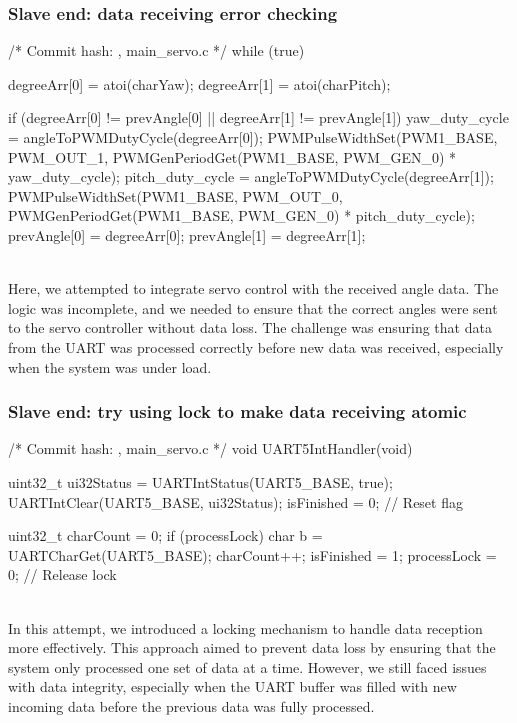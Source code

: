 \documentclass[12pt, a4paper]{article}
\begin{document}
\subsubsection{Slave end: data receiving error checking}\text{}
\begin{code}
/* Commit hash: , main_servo.c */
while (true) {
    degreeArr[0] = atoi(charYaw);
    degreeArr[1] = atoi(charPitch);

    if (degreeArr[0] != prevAngle[0] || degreeArr[1] != prevAngle[1]) {
        yaw_duty_cycle = angleToPWMDutyCycle(degreeArr[0]);
        PWMPulseWidthSet(PWM1_BASE, PWM_OUT_1, PWMGenPeriodGet(PWM1_BASE, PWM_GEN_0) * yaw_duty_cycle);
        pitch_duty_cycle = angleToPWMDutyCycle(degreeArr[1]);
        PWMPulseWidthSet(PWM1_BASE, PWM_OUT_0, PWMGenPeriodGet(PWM1_BASE, PWM_GEN_0) * pitch_duty_cycle);
        prevAngle[0] = degreeArr[0];
        prevAngle[1] = degreeArr[1];
    }
}
\end{code}\text{}\\
Here, we attempted to integrate servo control with the received angle data. 
The logic was incomplete, and we needed to ensure that the correct angles were sent to the servo 
controller without data loss. The challenge was ensuring that data from the UART was processed correctly 
before new data was received, especially when the system was under load.

\subsubsection{Slave end: try using lock to make data receiving atomic}\text{}
\begin{code}
/* Commit hash: , main_servo.c */
void UART5IntHandler(void) {
    uint32_t ui32Status = UARTIntStatus(UART5_BASE, true);
    UARTIntClear(UART5_BASE, ui32Status);
    isFinished = 0; // Reset flag

    uint32_t charCount = 0;
    if (processLock) {
        char b = UARTCharGet(UART5_BASE);
        charCount++;
    }
    isFinished = 1;
    processLock = 0; // Release lock
}
\end{code}\text{}\\
In this attempt, we introduced a locking mechanism to handle data reception more effectively. 
This approach aimed to prevent data loss by ensuring that the system only processed one set of data 
at a time. However, we still faced issues with data integrity, especially when the UART buffer was 
filled with new incoming data before the previous data was fully processed.
\end{document}

